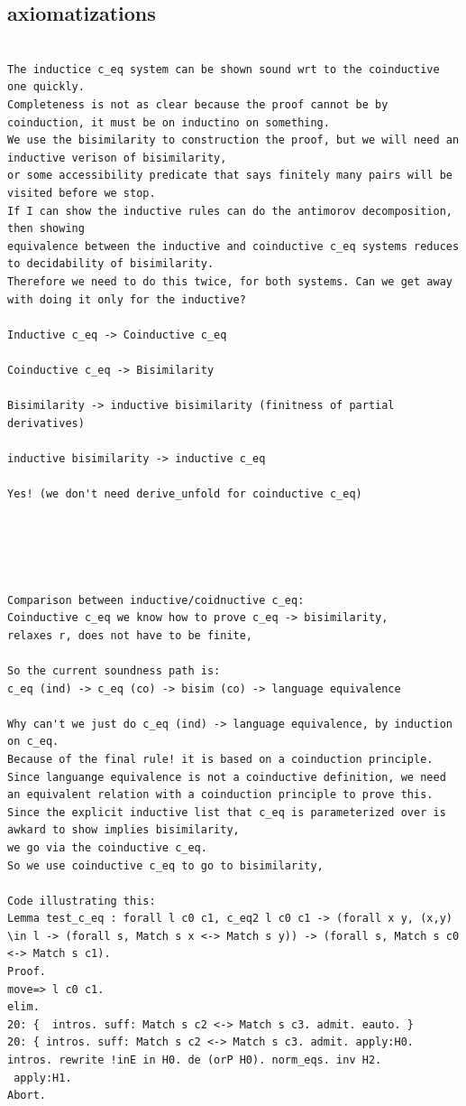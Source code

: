 \documentclass[a4paper,UKenglish,cleveref, autoref, thm-restate]{lipics-v2021}
\begin{document}
\subsection{axiomatizations}
\begin{verbatim}

The inductice c_eq system can be shown sound wrt to the coinductive one quickly.
Completeness is not as clear because the proof cannot be by coinduction, it must be on inductino on something.
We use the bisimilarity to construction the proof, but we will need an inductive verison of bisimilarity,
or some accessibility predicate that says finitely many pairs will be visited before we stop.
If I can show the inductive rules can do the antimorov decomposition, then showing 
equivalence between the inductive and coinductive c_eq systems reduces to decidability of bisimilarity.
Therefore we need to do this twice, for both systems. Can we get away with doing it only for the inductive?

Inductive c_eq -> Coinductive c_eq 

Coinductive c_eq -> Bisimilarity

Bisimilarity -> inductive bisimilarity (finitness of partial derivatives)

inductive bisimilarity -> inductive c_eq 

Yes! (we don't need derive_unfold for coinductive c_eq)





Comparison between inductive/coidnuctive c_eq:
Coinductive c_eq we know how to prove c_eq -> bisimilarity,
relaxes r, does not have to be finite,

So the current soundness path is:
c_eq (ind) -> c_eq (co) -> bisim (co) -> language equivalence

Why can't we just do c_eq (ind) -> language equivalence, by induction on c_eq.
Because of the final rule! it is based on a coinduction principle. Since languange equivalence is not a coinductive definition, we need an equivalent relation with a coinduction principle to prove this.
Since the explicit inductive list that c_eq is parameterized over is awkard to show implies bisimilarity,
we go via the coinductive c_eq.
So we use coinductive c_eq to go to bisimilarity,

Code illustrating this:
Lemma test_c_eq : forall l c0 c1, c_eq2 l c0 c1 -> (forall x y, (x,y) \in l -> (forall s, Match s x <-> Match s y)) -> (forall s, Match s c0 <-> Match s c1).
Proof.
move=> l c0 c1.
elim.
20: {  intros. suff: Match s c2 <-> Match s c3. admit. eauto. } 
20: { intros. suff: Match s c2 <-> Match s c3. admit. apply:H0.
intros. rewrite !inE in H0. de (orP H0). norm_eqs. inv H2.
 apply:H1.
Abort.








\end{verbatim}
\end{document}

